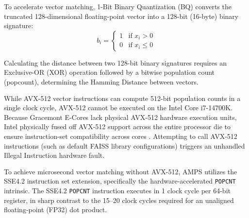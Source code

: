 To accelerate vector matching, 1-Bit Binary Quantization (BQ) converts the truncated 128-dimensional floating-point vector into a 128-bit (16-byte) binary signature:
\begin{equation}
    b_i = \begin{cases} 1 & \text{if } x_i > 0 \\ 0 & \text{if } x_i \le 0 \end{cases}
\end{equation}

Calculating the distance between two 128-bit binary signatures requires an Exclusive-OR (XOR) operation followed by a bitwise population count (popcount), determining the Hamming Distance between vectors.

While AVX-512 vector instructions can compute 512-bit population counts in a single clock cycle, AVX-512 cannot be executed on the Intel Core i7-14700K. Because Gracemont E-Cores lack physical AVX-512 hardware execution units, Intel physically fused off AVX-512 support across the entire processor die to ensure instruction-set compatibility across cores \cite{intel2024optimization}. Attempting to call AVX-512 instructions (such as default FAISS library configurations) triggers an unhandled Illegal Instruction hardware fault.

To achieve microsecond vector matching without AVX-512, AMPS utilizes the SSE4.2 instruction set extension, specifically the hardware-accelerated \texttt{POPCNT} intrinsic. The SSE4.2 \texttt{POPCNT} instruction executes in 1 clock cycle per 64-bit register, in sharp contrast to the 15--20 clock cycles required for an unaligned floating-point (FP32) dot product.

